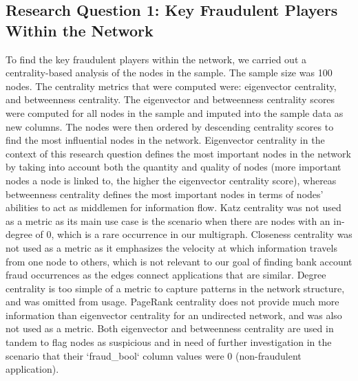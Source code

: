 \documentclass{styles/svproc}
\begin{document}
\subsection*{Research Question 1: Key Fraudulent Players Within the Network}
To find the key fraudulent players within the network, we carried out a centrality-based analysis of the nodes in the sample. The sample size was 100 nodes. The centrality metrics that were computed were: eigenvector centrality, and betweenness centrality. The eigenvector and betweenness centrality scores were computed for all nodes in the sample and imputed into the sample data as new columns. The nodes were then ordered by descending centrality scores to find the most influential nodes in the network. Eigenvector centrality in the context of this research question defines the most important nodes in the network by taking into account both the quantity and quality of nodes (more important nodes a node is linked to, the higher the eigenvector centrality score), whereas betweenness centrality defines the most important nodes in terms of nodes' abilities to act as middlemen for information flow. Katz centrality was not used as a metric as its main use case is the scenario when there are nodes with an in-degree of 0, which is a rare occurrence in our multigraph. Closeness centrality was not used as a metric as it emphasizes the velocity at which information travels from one node to others, which is not relevant to our goal of finding bank account fraud occurrences as the edges connect applications that are similar. Degree centrality is too simple of a metric to capture patterns in the network structure, and was omitted from usage. PageRank centrality does not provide much more information than eigenvector centrality for an undirected network, and was also not used as a metric. Both eigenvector and betweenness centrality are used in tandem to flag nodes as suspicious and in need of further investigation in the scenario that their `fraud\_bool` column values were 0 (non-fraudulent application).
\end{document}
